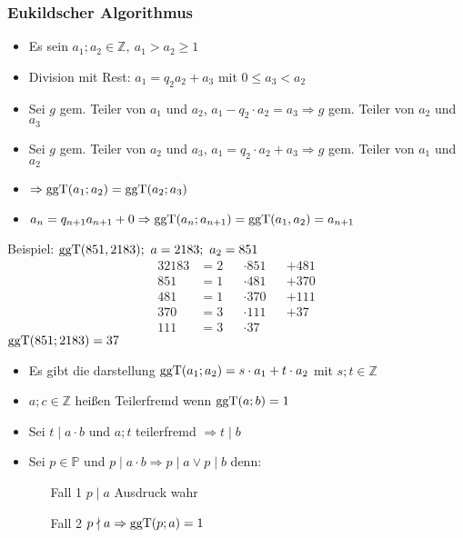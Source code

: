 \subsubsection{Eukildscher Algorithmus}
\begin{itemize}
    \item Es sein $a_1;a_2 \in \mathbb{Z},\ a_1 > a_2 \geq 1$
    \item Division mit Rest: $a_1 = q_2 a_2 + a_3$ mit $0 \leq a_3 < a_2$
    \item Sei $g$ gem. Teiler von $a_1$ und $a_2$, $a_1 - q_2 \cdot a_2 = a_3 \Rightarrow g$ gem. Teiler von $a_2$ und $a_3$
    \item Sei $g$ gem. Teiler von $a_2$ und $a_3$, $a_1 = q_2 \cdot a_2 + a_3 \Rightarrow g$ gem. Teiler von $a_1$ und $a_2$
    \item $\Rightarrow \operatorname{ggT}(a_1;a_2) = \operatorname{ggT}(a_2;a_3)$
    \item $a_{n}=q_{n+1}a_{n+1} + 0 \Rightarrow \operatorname{ggT}(a_n;a_{n+1}) = \operatorname{ggT}(a_1,a_2) = a_{n+1}$
\end{itemize}
Beispiel: $\operatorname{ggT}(851,2183);\ a=2183;\ a_2 = 851$
\begin{alignat*}{3}
    2183 & = 2 &  & \cdot 851 &  & + 481 \\
    851  & = 1 &  & \cdot 481 &  & + 370 \\
    481  & = 1 &  & \cdot 370 &  & + 111 \\
    370  & = 3 &  & \cdot 111 &  & + 37  \\
    111  & = 3 &  & \cdot 37
\end{alignat*}
$\operatorname{ggT}(851;2183) = 37$
\begin{itemize}
    \item Es gibt die darstellung $\operatorname{ggT}(a_1;a_2) = s\cdot a_1 + t \cdot a_2$ mit $s;t \in \mathbb{Z}$
    \item $a;c \in \mathbb{Z}$ heißen Teilerfremd wenn $\operatorname{ggT}(a;b) = 1$
    \item Sei $t \mid a \cdot b$ und $a;t$ teilerfremd $\Rightarrow t \mid b$
    \item Sei $p \in \mathbb{P}$ und $p \mid a \cdot b \Rightarrow p \mid a \vee p \mid b$ denn:
    \begin{itemize}
        \item[Fall 1] $p \mid a$ Ausdruck wahr
        \item[Fall 2] $p \nmid a \Rightarrow \operatorname{ggT}(p;a) = 1$
    \end{itemize}
\end{itemize}